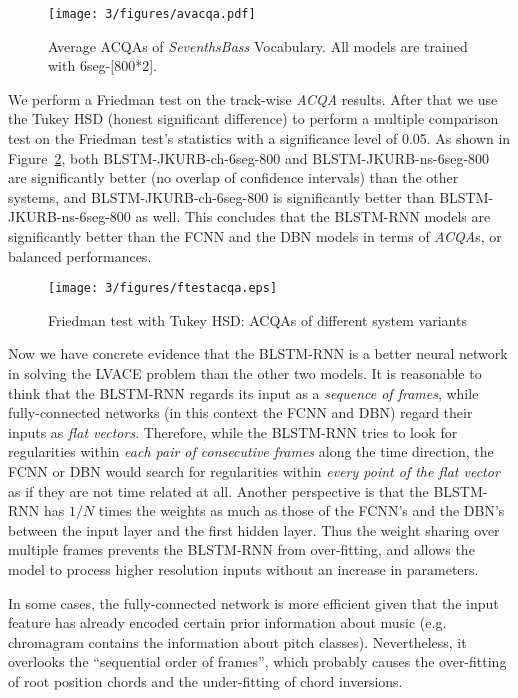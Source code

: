 \begin{figure}[h!]
	\centering
	\texttt{[image: 3/figures/avacqa.pdf]}
	\caption{Average ACQAs of \textit{SeventhsBass} Vocabulary. All models are trained with 6seg-[800*2].}
	\label{fig:3-acqa}
\end{figure}
We perform a Friedman test \cite{friedman1937use} on the track-wise \textit{ACQA} results. After that we use the Tukey HSD (honest significant difference) \cite{tukey1949comparing} to perform a multiple comparison test on the Friedman test's statistics with a significance level of 0.05. As shown in Figure~\ref{fig:3-friedmanacqa}, both BLSTM-JKURB-ch-6seg-800 and BLSTM-JKURB-ns-6seg-800 are significantly better (no overlap of confidence intervals) than the other systems, and BLSTM-JKURB-ch-6seg-800 is significantly better than BLSTM-JKURB-ns-6seg-800 as well. This concludes that the BLSTM-RNN models are significantly better than the FCNN and the DBN models in terms of \textit{ACQA}s, or balanced performances.
\begin{figure}[h!]
	\centering
	\texttt{[image: 3/figures/ftestacqa.eps]}
	\caption{Friedman test with Tukey HSD: ACQAs of different system variants}
	\label{fig:3-friedmanacqa}
\end{figure}

Now we have concrete evidence that the BLSTM-RNN is a better neural network in solving the LVACE problem than the other two models. It is reasonable to think that the BLSTM-RNN regards its input as a {\it sequence of frames}, while fully-connected networks (in this context the FCNN and DBN) regard their inputs as \textit{flat vectors}. Therefore, while the BLSTM-RNN tries to look for regularities within \textit{each pair of consecutive frames} along the time direction, the FCNN or DBN would search for regularities within \textit{every point of the flat vector} as if they are not time related at all. Another perspective is that the BLSTM-RNN has $1/N$ times the weights as much as those of the FCNN's and the DBN's between the input layer and the first hidden layer. Thus the weight sharing over multiple frames prevents the BLSTM-RNN from over-fitting, and allows the model to process higher resolution inputs without an increase in parameters.

In some cases, the fully-connected network is more efficient given that the input feature has already encoded certain prior information about music (e.g. chromagram contains the information about pitch classes). Nevertheless, it overlooks the ``sequential order of frames'', which probably causes the over-fitting of root position chords and the under-fitting of chord inversions.

